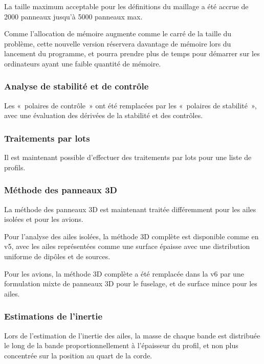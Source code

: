 \documentclass[a4paper,twoside,12pt,dvips]{article}
\begin{document}
La taille maximum acceptable pour les définitions du maillage a été accrue
de 2000 panneaux jusqu’à 5000 panneaux max.

Comme l’allocation de mémoire augmente comme le carré de la taille du problème,
cette nouvelle version réservera davantage de mémoire lors du lancement du 
programme, et pourra prendre plus de temps pour démarrer sur les ordinateurs 
ayant une faible quantité de mémoire.

\subsubsection{Analyse de stabilité et de contrôle}

Les «~polaires de contrôle~» ont été remplacées par les «~polaires de
stabilité~», avec une évaluation des dérivées de la stabilité et des
contrôles.

\subsubsection{Traitements par lots}

Il est maintenant possible d’effectuer des traitements par lots pour une
liste de profils.

\subsubsection{Méthode des panneaux 3D}

La méthode des panneaux 3D est maintenant traitée différemment pour les
ailes isolées et pour les avions.

Pour l’analyse des ailes isolées, la méthode 3D complète est disponible
comme en v5, avec les ailes représentées comme une surface épaisse avec
une distribution uniforme de dipôles et de sources.

Pour les avions, la méthode 3D complète a été remplacée dans la v6 par une
formulation mixte de panneaux 3D pour le fuselage, et de surface mince pour
les ailes.

\subsubsection{Estimations de l’inertie}

Lors de l’estimation de l’inertie des ailes, la masse de chaque bande est
distribuée le long de la bande proportionnellement à l’épaisseur du profil,
et non plus concentrée sur la position au quart de la corde.
\end{document}
